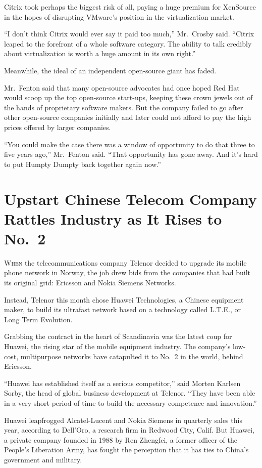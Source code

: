 ﻿\documentclass[12pt]{article}
\begin{document}
Citrix took perhaps the biggest risk of all, paying a huge premium for XenSource in the hopes of
disrupting VMware's position in the virtualization market.

``I don't think Citrix would ever say it paid too much,'' Mr.~Crosby said. ``Citrix leaped to the
forefront of a whole software category. The ability to talk credibly about virtualization is worth a
huge amount in its own right.''

Meanwhile, the ideal of an independent open-source giant has faded.

Mr.~Fenton said that many open-source advocates had once hoped Red Hat would scoop up the top
open-source start-ups, keeping these crown jewels out of the hands of proprietary software makers.
But the company failed to go after other open-source companies initially and later could not afford
to pay the high prices offered by larger companies.

``You could make the case there was a window of opportunity to do that three to five years ago,''
Mr.~Fenton said. ``That opportunity has gone away. And it's hard to put Humpty Dumpty back together
again now.''

\section{Upstart Chinese Telecom Company Rattles Industry as It Rises to No.~2}

\lettrine{W}{hen} the telecommunications company Telenor decided to upgrade
its mobile phone network in Norway, the job drew bids from the companies that had built its original
grid: Ericsson and Nokia Siemens Networks.

Instead, Telenor this month chose Huawei Technologies, a Chinese equipment maker, to build its
ultrafast network based on a technology called L.T.E., or Long Term Evolution.

Grabbing the contract in the heart of Scandinavia was the latest coup for Huawei, the rising star of
the mobile equipment industry. The company's low-cost, multipurpose networks have catapulted it to
No.~2 in the world, behind Ericsson.

``Huawei has established itself as a serious competitor,'' said Morten Karlsen Sorby, the head of
global business development at Telenor. ``They have been able in a very short period of time to
build the necessary competence and innovation.''

Huawei leapfrogged Alcatel-Lucent and Nokia Siemens in quarterly sales this year, according to
Dell'Oro, a research firm in Redwood City, Calif. But Huawei, a private company founded in 1988 by
Ren Zhengfei, a former officer of the People's Liberation Army, has fought the perception that it
has ties to China's government and military.
\end{document}
